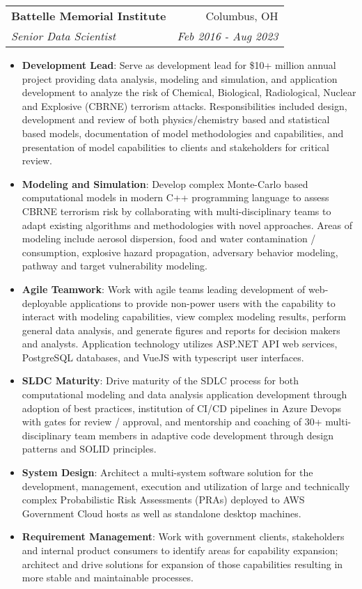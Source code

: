 \documentclass[letterpaper,11pt]{article}
\makeatletter
\newcommand{\resumeItem}[2]{
  \item\small{
    \textbf{#1}{: #2 \vspace{-2pt}}
  }
}
\newcommand{\resumeSubheading}[4]{
  \vspace{-1pt}\item
    \begin{tabular*}{0.97\textwidth}[t]{l@{\extracolsep{\fill}}r}
      \textbf{#1} & #2 \\
      \textit{\small#3} & \textit{\small #4} \\
    \end{tabular*}\vspace{-5pt}
}
\newcommand{\resumeItemListStart}{\begin{itemize}}
\newcommand{\resumeItemListEnd}{\end{itemize}\vspace{-5pt}}
\makeatother
\begin{document}
    \resumeSubheading
      {Battelle Memorial Institute}{Columbus, OH}
      {Senior Data Scientist}{Feb 2016 - Aug 2023}
      \resumeItemListStart
        \resumeItem{Development Lead}
          {Serve as development lead for \$10+ million annual project providing data analysis, modeling and simulation, and application development to analyze the risk of Chemical, Biological, Radiological, Nuclear and Explosive (CBRNE) terrorism attacks. Responsibilities included design, development and review of both physics/chemistry based and statistical based models, documentation of model methodologies and capabilities, and presentation of model capabilities to clients and stakeholders for critical review.}
        \resumeItem{Modeling and Simulation}
          {Develop complex Monte-Carlo based computational models in modern C++ programming language to assess CBRNE terrorism risk by collaborating with multi-disciplinary teams to adapt existing algorithms and methodologies with novel approaches. Areas of modeling include aerosol dispersion, food and water contamination / consumption, explosive hazard propagation, adversary behavior modeling, pathway and target vulnerability modeling.}
        \resumeItem{Agile Teamwork}
          {Work with agile teams leading development of web-deployable applications to provide non-power users with the capability to interact with modeling capabilities, view complex modeling results, perform general data analysis, and generate figures and reports for decision makers and analysts. Application technology utilizes ASP.NET API web services, PostgreSQL databases, and VueJS with typescript user interfaces. }
        \resumeItem{SLDC Maturity}
          {Drive maturity of the SDLC process for both computational modeling and data analysis application development through adoption of best practices, institution of CI/CD pipelines in Azure Devops with gates for review / approval, and mentorship and coaching of 30+ multi-disciplinary team members in adaptive code development through design patterns and SOLID principles.}
        \resumeItem{System Design}
          {Architect a multi-system software solution for the development, management, execution and utilization of large and technically complex Probabilistic Risk Assessments (PRAs) deployed to AWS Government Cloud hosts as well as standalone desktop machines.}
        \resumeItem{Requirement Management}
          {Work with government clients, stakeholders and internal product consumers to identify areas for capability expansion; architect and drive solutions for expansion of those capabilities resulting in more stable and maintainable processes.}
      \resumeItemListEnd
\end{document}
